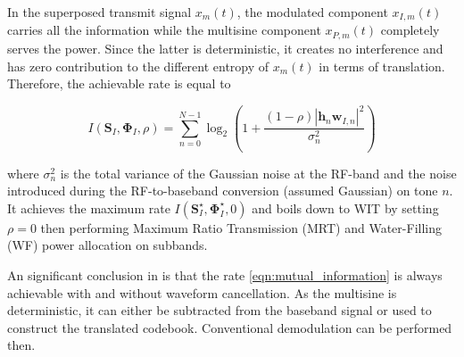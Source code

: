 In the superposed transmit signal ${x_m}(t)$, the modulated component ${x_{I,m}}(t)$ carries all the information while the multisine component ${x_{P,m}}(t)$ completely serves the power. Since the latter is deterministic, it creates no interference and has zero contribution to the different entropy of ${x_m}(t)$ in terms of translation. Therefore, the achievable rate is equal to

\begin{equation}\label{eqn:mutual_information}
  I\left( {{{\mathbf{S}}_I},{{\mathbf{\Phi }}_I},\rho } \right) = \sum\limits_{n = 0}^{N - 1} {{{\log }_2}} \left( {1 + \frac{{(1 - \rho ){{\left| {{{\mathbf{h}}_n}{{\mathbf{w}}_{I,n}}} \right|}^2}}}{{\sigma _n^2}}} \right)
\end{equation}

where ${\sigma _n^2}$ is the total variance of the Gaussian noise at the RF-band and the noise introduced during the RF-to-baseband conversion (assumed Gaussian) on tone $n$. It achieves the maximum rate $I\left( {{\mathbf{S}}_I^ \star ,{\mathbf{\Phi }}_I^ \star ,0} \right)$ and boils down to WIT by setting $\rho  = 0$ then performing Maximum Ratio Transmission (MRT) and Water-Filling (WF) power allocation on subbands.

An significant conclusion in \cite{Clerckx2018} is that the rate \ref{eqn:mutual_information} is always achievable with and without waveform cancellation. As the multisine is deterministic, it can either be subtracted from the baseband signal or used to construct the translated codebook. Conventional demodulation can be performed then.